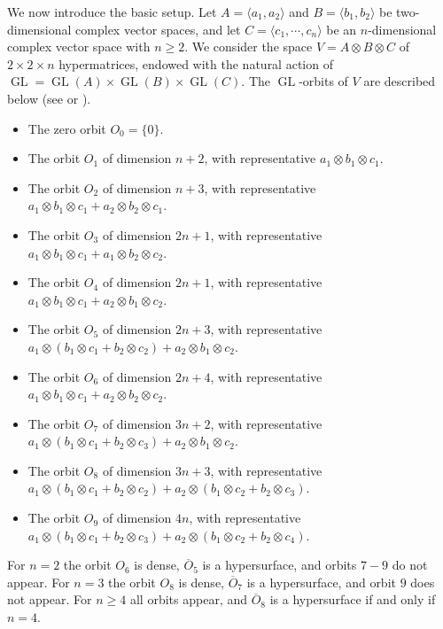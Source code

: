 \documentclass[11pt,reqno]{amsart}
\newcommand{\oo}{\otimes}
\newcommand{\GL}{\operatorname{GL}}
\newcommand{\ol}[1]{\overline{#1}}
\numberwithin{equation}{section}
\begin{document}
We now introduce the basic setup. Let $A=\langle a_1, a_2\rangle$ and $B=\langle b_1, b_2\rangle$ be two-dimensional complex vector spaces, and let $C=\langle c_1,\cdots,c_n\rangle$ be an $n$-dimensional complex vector space with $n\geq 2$. We consider the space $V=A\oo B\oo C$ of $2\times 2\times n$ hypermatrices, endowed with the natural action of $\GL=\GL(A)\times \GL(B)\times \GL(C)$. The $\GL$-orbits of $V$ are described below (see \cite[Table 10.3.1]{landsberg2012tensors} or \cite{parfenov}).
\begin{itemize}
\item The zero orbit $O_0=\{0\}$. 

\item The orbit $O_1$ of dimension $n+2$, with representative $a_1\oo b_1\oo c_1$.

\item The orbit $O_2$ of dimension $n+3$, with representative $a_1\oo b_1\oo c_1+a_2\oo b_2\oo c_1$.

\item The orbit $O_3$ of dimension $2n+1$, with representative $a_1\oo b_1\oo c_1+a_1\oo b_2\oo c_2$.

\item The orbit $O_4$ of dimension $2n+1$, with representative $a_1\oo b_1\oo c_1+a_2\oo b_1\oo c_2$.

\item The orbit $O_5$ of dimension $2n+3$, with representative $a_1\oo(b_1\oo c_1+b_2\oo c_2)+a_2\oo b_1\oo c_2$.

\item The orbit $O_6$ of dimension $2n+4$, with representative $a_1\oo b_1\oo c_1+a_2\oo b_2\oo c_2$.

\item The orbit $O_7$ of dimension $3n+2$, with representative $a_1\oo(b_1\oo c_1+b_2\oo c_3)+a_2\oo b_1\oo c_2$.

\item The orbit $O_8$ of dimension $3n+3$, with representative $a_1\oo (b_1\oo c_1+b_2\oo c_2)+a_2\oo (b_1\oo c_2+b_2\oo c_3)$.

\item The orbit $O_9$ of dimension $4n$, with representative $a_1\oo(b_1\oo c_1+b_2\oo c_3)+a_2\oo (b_1\oo c_2+b_2\oo c_4)$.
\end{itemize}

For $n=2$ the orbit $O_6$ is dense, $\ol{O}_5$  is a hypersurface, and orbits $7-9$ do not appear. For $n=3$ the orbit $O_8$ is dense, $\ol{O}_7$ is a hypersurface, and orbit $9$ does not appear. For $n\geq 4$ all orbits appear, and $\ol{O}_8$ is a hypersurface if and only if $n=4$.
\end{document}
